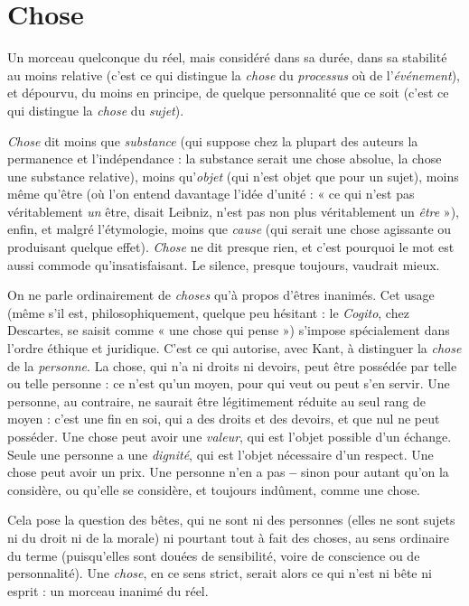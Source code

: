 \section{Chose}
Un morceau quelconque du réel, mais considéré dans sa durée,
dans sa stabilité au moins relative (c’est ce qui distingue la {\it chose} du
{\it processus} où de l'{\it événement}), et dépourvu, du moins en principe, de quelque
personnalité que ce soit (c’est ce qui distingue la {\it chose} du {\it sujet}).

{\it Chose} dit moins que {\it substance} (qui suppose chez la plupart des auteurs la
permanence et l'indépendance : la substance serait une chose absolue, la chose
une substance relative), moins qu’{\it objet} (qui n’est objet que pour un sujet),
moins même qu'être (où l’on entend davantage l’idée d’unité : « ce qui n'est
pas véritablement {\it un} être, disait Leibniz, n’est pas non plus véritablement un
{\it être} »), enfin, et malgré l’étymologie, moins que {\it cause} (qui serait une chose agissante
ou produisant quelque effet). {\it Chose} ne dit presque rien, et c’est pourquoi
le mot est aussi commode qu’insatisfaisant. Le silence, presque toujours, vaudrait
mieux.

On ne parle ordinairement de {\it choses} qu’à propos d’êtres inanimés. Cet
usage (même s’il est, philosophiquement, quelque peu hésitant : le {\it Cogito}, chez
Descartes, se saisit comme « une chose qui pense ») s'impose spécialement dans
l’ordre éthique et juridique. C’est ce qui autorise, avec Kant, à distinguer la
{\it chose} de la {\it personne}. La chose, qui n’a ni droits ni devoirs, peut être possédée
par telle ou telle personne : ce n’est qu’un moyen, pour qui veut ou peut s’en
servir. Une personne, au contraire, ne saurait être légitimement réduite au seul
rang de moyen : c’est une fin en soi, qui a des droits et des devoirs, et que nul
ne peut posséder. Une chose peut avoir une {\it valeur}, qui est l’objet possible d’un
échange. Seule une personne a une {\it dignité}, qui est l’objet nécessaire d’un respect.
Une chose peut avoir un prix. Une personne n’en a pas {\bf --} sinon pour
autant qu'on la considère, ou qu’elle se considère, et toujours indûment,
comme une chose.

Cela pose la question des bêtes, qui ne sont ni des personnes (elles ne sont
sujets ni du droit ni de la morale) ni pourtant tout à fait des choses, au sens
ordinaire du terme (puisqu'elles sont douées de sensibilité, voire de conscience
ou de personnalité). Une {\it chose}, en ce sens strict, serait alors ce qui n’est ni bête
ni esprit : un morceau inanimé du réel.

